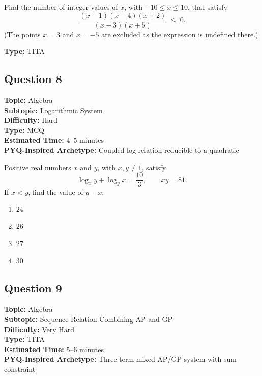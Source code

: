 \documentclass[11pt]{article}
\begin{document}
\begin{tcolorbox}
Find the number of integer values of \(x\), with \(-10 \le x \le 10\), that satisfy
\[
\frac{(x-1)(x-4)(x+2)}{(x-3)(x+5)} \;\le\; 0.
\]
(The points \(x=3\) and \(x=-5\) are excluded as the expression is undefined there.)
\end{tcolorbox}

\textbf{Type:} TITA

\subsection*{Question 8}

\textbf{Topic:} Algebra \\
\textbf{Subtopic:} Logarithmic System \\
\textbf{Difficulty:} Hard \\
\textbf{Type:} MCQ \\
\textbf{Estimated Time:} 4--5 minutes \\
\textbf{PYQ-Inspired Archetype:} Coupled log relation reducible to a quadratic

\begin{tcolorbox}
Positive real numbers \(x\) and \(y\), with \(x, y \neq 1\), satisfy
\[
\log_x y + \log_y x = \frac{10}{3}, \qquad xy = 81.
\]
If \(x < y\), find the value of \(y - x\).
\end{tcolorbox}

\begin{enumerate}[label=(\Alph*)]
    \item \(24\)
    \item \(26\)
    \item \(27\)
    \item \(30\)
\end{enumerate}

\subsection*{Question 9}

\textbf{Topic:} Algebra \\
\textbf{Subtopic:} Sequence Relation Combining AP and GP \\
\textbf{Difficulty:} Very Hard \\
\textbf{Type:} TITA \\
\textbf{Estimated Time:} 5--6 minutes \\
\textbf{PYQ-Inspired Archetype:} Three-term mixed AP/GP system with sum constraint
\end{document}
